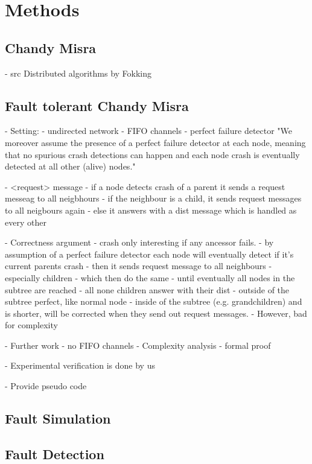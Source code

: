 \section{Methods}  %

\subsection{Chandy Misra}
 - src Distributed algorithms by Fokking
\subsection {Fault tolerant Chandy Misra}
  
   
  - Setting:
    - undirected network
    - FIFO channels
    - perfect failure detector "We moreover assume the
    presence of a perfect failure detector at each node, meaning
    that no spurious crash detections can happen and each node
    crash is eventually detected at all other (alive) nodes."
    
  
  - <request> message
    - if a node detects crash of a parent it sends a request messeag to all neigbhours
      - if the neighbour is a child, it sends request messages to all neigbours again
      - else it answers with a dist message which is handled as every other
  
  - Correctness argument
    - crash only interesting if any ancessor fails.
    - by assumption of a perfect failure detector each node will eventually detect
      if it's current parents crash 
    - then it sends request message to all neighbours
      - especially children
        - which then do the same
        - until eventually all nodes in the subtree are reached
      - all none children answer with their dist
        - outside of the subtree perfect, like normal node
        - inside of the subtree (e.g. grandchildren) and is shorter, will be corrected
          when they send out request messages.
            - However, bad for complexity
            
        
  - Further work
    - no FIFO channels
    - Complexity analysis
    - formal proof
    
  - Experimental verification is done by us
  
  - Provide pseudo code 
  
\subsection{Fault Simulation}
\subsection{Fault Detection}
